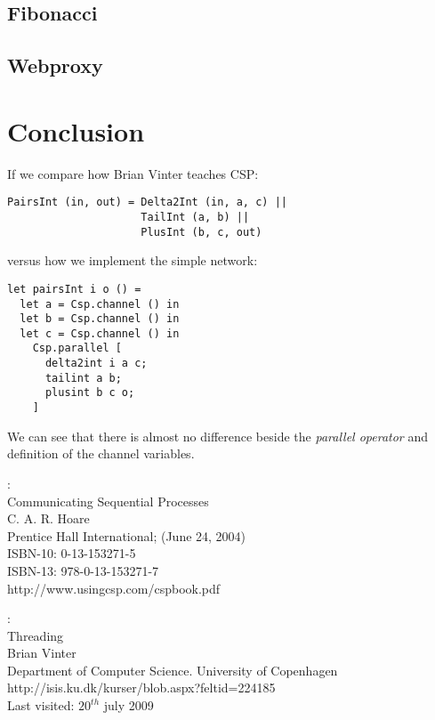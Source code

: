 \documentclass[a4paper,12pt]{article}
\begin{document}
\subsection{Fibonacci}


\subsection{Webproxy}


\section{Conclusion}
\label{conclusion}

If we compare how Brian Vinter teaches CSP\cite{vinter}:
\begin{center}
\begin{verbatim}
PairsInt (in, out) = Delta2Int (in, a, c) || 
                     TailInt (a, b) || 
                     PlusInt (b, c, out) 
\end{verbatim}
\end{center}

versus how we implement the simple network:

\begin{verbatim}
let pairsInt i o () =
  let a = Csp.channel () in
  let b = Csp.channel () in
  let c = Csp.channel () in
    Csp.parallel [
      delta2int i a c;
      tailint a b;
      plusint b c o;
    ]
\end{verbatim}

We can see that there is almost no difference beside the {\it parallel operator}
and definition of the channel variables.

\begin{thebibliography}{99}

:\\
Communicating Sequential Processes\\
C. A. R. Hoare\\
Prentice Hall International; (June 24, 2004)\\
ISBN-10: 0-13-153271-5\\
ISBN-13: 978-0-13-153271-7\\
http://www.usingcsp.com/cspbook.pdf

:\\
Threading\\
Brian Vinter\\
Department of Computer Science. University of Copenhagen\\
http://isis.ku.dk/kurser/blob.aspx?feltid=224185\\
Last visited: $20^{th}$ july 2009



\end{thebibliography}
\end{document}
